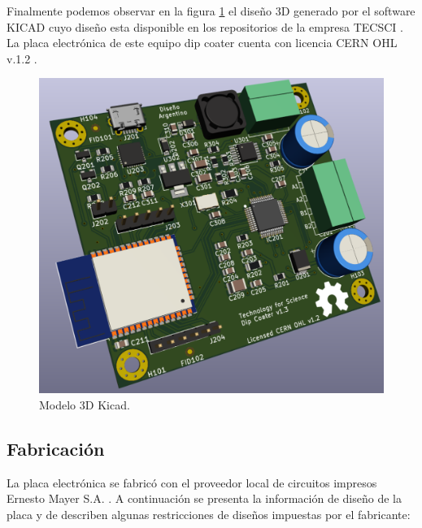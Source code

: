   
Finalmente podemos observar en la figura \ref{fig:dip_3d_model} el diseño 3D generado por el software KICAD cuyo diseño esta disponible en los repositorios de la empresa TECSCI \citep{web_hardware_tecsci}. La placa electrónica de este equipo dip coater cuenta con licencia CERN OHL v.1.2 \citep{web_cern_licence}.


\begin{figure}[h]
	\centering
	\includegraphics[width=.5\textwidth]{./Figures/dip_3d_model.pdf}
	\caption{Modelo 3D Kicad.}
	\label{fig:dip_3d_model}
\end{figure}
         



  
\subsection{Fabricación}
La placa electrónica se fabricó con el proveedor local de circuitos impresos Ernesto Mayer S.A. \citep{web_mayer}. A continuación se presenta la información de diseño de la placa y de describen algunas  restricciones de diseños impuestas por el fabricante:

